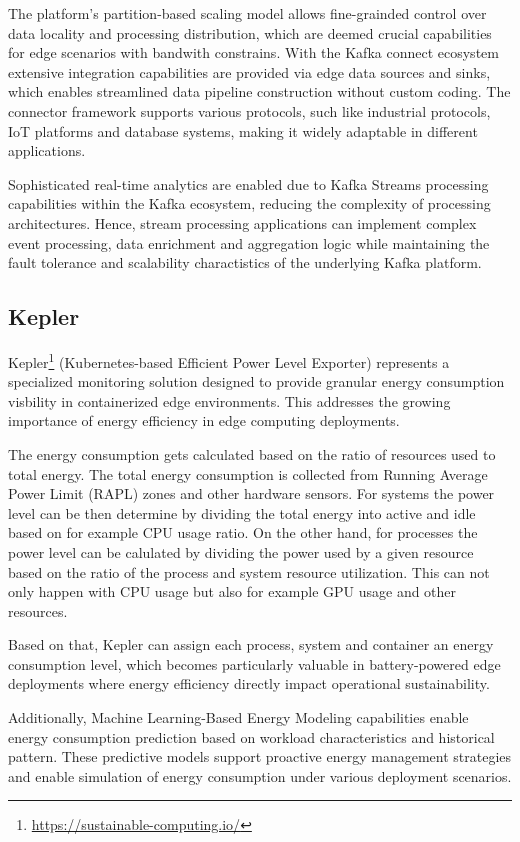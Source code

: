 The platform's partition-based scaling model allows fine-grainded control over data locality and processing distribution, which are deemed crucial capabilities for edge scenarios with bandwith constrains. With the Kafka connect ecosystem extensive integration capabilities are provided via edge data sources and sinks, which enables streamlined data pipeline construction without custom coding.
The connector framework supports various protocols, such like industrial protocols, IoT platforms and database systems, making it widely adaptable in different applications.

Sophisticated real-time analytics are enabled due to Kafka Streams processing capabilities within the Kafka ecosystem, reducing the complexity of processing architectures.
Hence, stream processing applications can implement complex event processing, data enrichment and aggregation logic while maintaining the fault tolerance and scalability charactistics of the underlying Kafka platform.
\subsection{Kepler}
Kepler\footnote{\url{https://sustainable-computing.io/}} (Kubernetes-based Efficient Power Level Exporter) represents a specialized monitoring solution designed to provide granular energy consumption visbility in containerized edge environments.
This addresses the growing importance of energy efficiency in edge computing deployments.

The energy consumption gets calculated based on the ratio of resources used to total energy.
The total energy consumption is collected from Running Average Power Limit (RAPL) zones and other hardware sensors.
For systems the power level can be then determine by dividing the total energy into active and idle based on for example CPU usage ratio.
On the other hand, for processes the power level can be calulated by dividing the power used by a given resource based on the ratio of the process and system resource utilization.
This can not only happen with CPU usage but also for example GPU usage and other resources.

Based on that, Kepler can assign each process, system and container an energy consumption level, which becomes particularly valuable in battery-powered edge deployments where energy efficiency directly impact operational sustainability.

Additionally, Machine Learning-Based Energy Modeling capabilities enable energy consumption prediction based on workload characteristics and historical pattern. These predictive models support proactive energy management strategies and enable simulation of energy consumption under various deployment scenarios.

